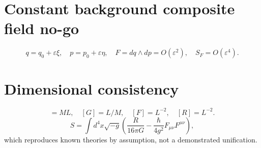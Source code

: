 \documentclass[11pt]{article}
\begin{document}
\section{Constant background composite field no-go}
\begin{equation}
q=q_0+\varepsilon\xi,\quad p=p_0+\varepsilon\eta,\quad
F=dq\wedge dp=O(\varepsilon^2),\quad S_F=O(\varepsilon^4).
\end{equation}
\section{Dimensional consistency}
\begin{equation}
[\hbar]=ML,\quad[G]=L/M,\quad [F]=L^{-2},\quad [R]=L^{-2}.
\end{equation}
\begin{equation}
S=\int d^4x\sqrt{-g}\left(\frac{R}{16\pi G}-\frac{\hbar}{4g^2}F_{\mu\nu}F^{\mu\nu}\right),
\end{equation}
which reproduces known theories by assumption, not a demonstrated unification.
\end{document}
